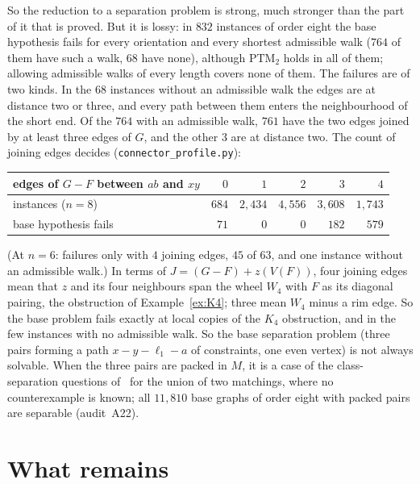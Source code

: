\documentclass[11pt]{amsart}
\theoremstyle{definition}
\newcommand{\PTM}{\mathrm{PTM}}
\begin{document}
So the reduction to a separation problem is strong, much stronger than the part of it that is
proved. But it is lossy: in $832$ instances of order eight the base hypothesis fails for every
orientation and every shortest admissible walk ($764$ of them have such a walk, $68$ have none),
although $\PTM_2$ holds in all of them; allowing admissible walks of every length covers none of
them. The failures are of two kinds. In the $68$ instances without an admissible walk
the edges are at distance two or three, and every path between them enters the neighbourhood of
the short end. Of the $764$ with an admissible walk, $761$ have the two edges joined by at least
three edges of $G$, and the other $3$ are at distance two. The count of joining edges decides
(\texttt{connector\_profile.py}):
\begin{center}\footnotesize
\begin{tabular}{@{}lrrrrr@{}}
\toprule
edges of $G-F$ between $ab$ and $xy$ & $0$ & $1$ & $2$ & $3$ & $4$\\
\midrule
instances ($n=8$) & $684$ & $2{,}434$ & $4{,}556$ & $3{,}608$ & $1{,}743$\\
base hypothesis fails & $71$ & $0$ & $0$ & $182$ & $579$\\
\bottomrule
\end{tabular}
\end{center}
(At $n=6$: failures only with $4$ joining edges, $45$ of $63$, and one instance without an
admissible walk.) In terms of $J=(G-F)+z(V(F))$, four joining edges mean that $z$ and its four
neighbours span the wheel $W_4$ with $F$ as its diagonal pairing, the obstruction of
Example~\ref{ex:K4}; three mean $W_4$ minus a rim edge. So the base problem fails exactly at local
copies of the $K_4$ obstruction, and in the few instances with no admissible walk. So the base separation problem (three pairs forming a path $x-y-\ell_1-a$ of
constraints, one even vertex) is not always solvable. When the three pairs are packed in $M$, it
is a case of the class-separation questions of~\cite{MS} for the union of two matchings, where no
counterexample is known; all $11{,}810$ base graphs of order eight with packed pairs are
separable (audit~A22).

\section{What remains}\label{sec:open}
\end{document}

